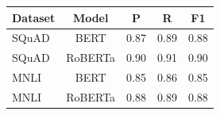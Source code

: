 \begin{table}[htbp]
\centering
\begin{tabular}{lcccc}
\toprule
Dataset & Model & P & R & F1 \\
\midrule
SQuAD & BERT & 0.87 & 0.89 & 0.88 \\
SQuAD & RoBERTa & 0.90 & 0.91 & 0.90 \\
MNLI & BERT & 0.85 & 0.86 & 0.85 \\
MNLI & RoBERTa & 0.88 & 0.89 & 0.88 \\
\bottomrule
\end{tabular}
\end{table}
